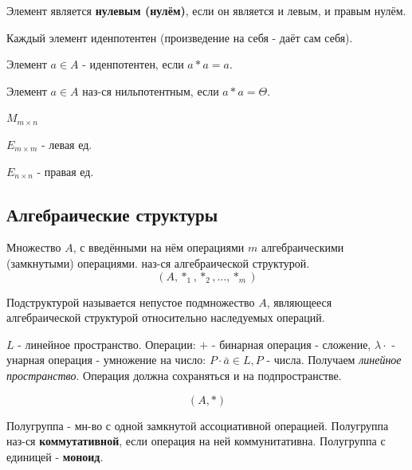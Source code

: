 \begin{definition}
	Элемент является \textbf{нулевым (нулём)}, если он является и левым, и правым нулём.
	
	Каждый элемент иденпотентен (произведение на себя - даёт сам себя).
\end{definition}

\begin{definition}
	Элемент $a \in A$ - иденпотентен, если $a * a = a$.
\end{definition}

\begin{definition}
	Элемент $a \in A$ наз-ся нильпотентным, если $a * a = \Theta$.
\end{definition}

\begin{exmp}
	$M_{m \times n}$
	
	$E_{m \times m}$ - левая ед.
	
	$E_{n \times n}$ - правая ед.
\end{exmp}

\subsection{Алгебраические структуры}

\begin{definition}
	Множество $A$, с введёнными на нём операциями $m$ алгебраическими (замкнутыми) операциями. наз-ся алгебраической структурой.
	\[ (A, *_1, *_2, \dots, *_m) \]
\end{definition}

\begin{definition}[Подструктура]
	Подструктурой называется непустое подмножество $A$, являющееся алгебраической структурой относительно наследуемых операций.
\end{definition}

\begin{exmp}
	$L$ - линейное пространство. Операции: $+$ - бинарная операция - сложение, $\lambda \cdot$ - унарная операция - умножение на число: $P \cdot \bar a \in L, P$ - числа. Получаем \textit{линейное пространство}. Операция должна сохраняться и на подпространстве.
\end{exmp}

\[ (A, *) \]

\begin{definition}
	Полугруппа - мн-во с одной замкнутой ассоциативной операцией. Полугруппа наз-ся \textbf{коммутативной}, если операция на ней коммунитативна. Полугруппа с единицей - \textbf{моноид}.
\end{definition}

